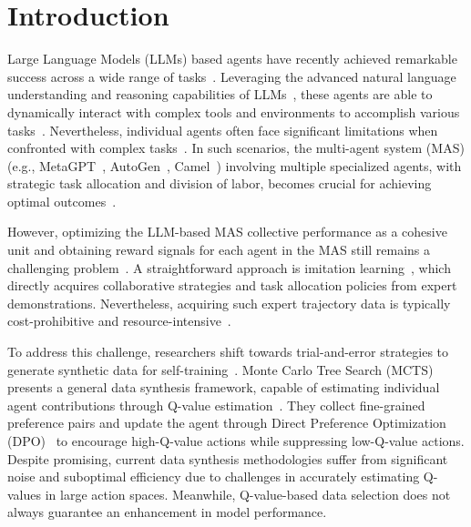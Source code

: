 \section{Introduction}


Large Language Models (LLMs) based agents have recently achieved remarkable success across a wide range of tasks~\cite{202412.2294, Wang_2024, xi2023risepotentiallargelanguage, zhang2024largelanguagemodelbrainedgui}. Leveraging the advanced natural language understanding and reasoning capabilities of LLMs~\cite{DBLP:journals/corr/abs-2303-08774, DBLP:conf/nips/Wei0SBIXCLZ22}, these agents are able to dynamically interact with complex tools and environments to accomplish various tasks~\cite{ DBLP:journals/corr/abs-2310-05915, DBLP:conf/iclr/YaoZYDSN023}. Nevertheless, individual agents often face significant limitations when confronted with complex tasks~\cite{DBLP:conf/emnlp/ShiYWWF24}. In such scenarios, the multi-agent system (MAS) (e.g., MetaGPT~\cite{DBLP:conf/iclr/HongZCZCWZWYLZR24}, AutoGen~\cite{DBLP:journals/corr/abs-2308-08155}, Camel~\cite{DBLP:conf/nips/LiHIKG23}) involving multiple specialized agents, with strategic task allocation and division of labor, becomes crucial for achieving optimal outcomes~\cite{DBLP:conf/ijcai/GuoCWCPCW024}.

However, optimizing the LLM-based MAS collective performance as a cohesive unit and obtaining reward signals for each agent in the MAS still remains a challenging problem~\cite{DBLP:journals/corr/abs-2410-08115}. A straightforward approach is imitation learning~\cite{DBLP:conf/icml/LeY0L17, DBLP:conf/acl/ZengLLWLD024}, which directly acquires collaborative strategies and task allocation policies from expert demonstrations. Nevertheless, acquiring such expert trajectory data is typically cost-prohibitive and resource-intensive~\cite{DBLP:journals/corr/abs-2409-00134}.


To address this challenge, researchers shift towards trial-and-error strategies to generate synthetic data for self-training~\cite{DBLP:conf/acl/SongYYHLL24}. 
Monte Carlo Tree Search (MCTS)~\cite{li2025enhancingreasoningprocesssupervision, guan2025rstarmathsmallllmsmaster} presents a general data synthesis framework, capable of estimating individual agent contributions through Q-value estimation~\cite{DBLP:journals/corr/abs-2410-08115}. They collect fine-grained preference pairs and update the agent through Direct Preference Optimization (DPO)~\cite{DBLP:conf/nips/RafailovSMMEF23} to encourage high-Q-value actions while suppressing low-Q-value actions. Despite promising, current data synthesis methodologies suffer from significant noise and suboptimal efficiency due to challenges in accurately estimating Q-values in large action spaces. Meanwhile, Q-value-based data selection does not always guarantee an enhancement in model performance.

